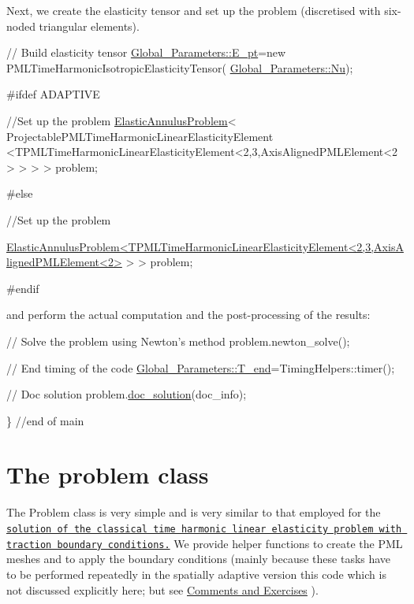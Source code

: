 Next, we create the elasticity tensor and set up the problem (discretised with six-\/noded triangular elements). 
\begin{DoxyCodeInclude}
 \textcolor{comment}{// Build elasticity tensor}
 \hyperlink{namespaceGlobal__Parameters_a9dc0631434879b47501f64851ad679b8}{Global\_Parameters::E\_pt}=\textcolor{keyword}{new} PMLTimeHarmonicIsotropicElasticityTensor(
    \hyperlink{namespaceGlobal__Parameters_a20fccdcfa2c15ad8b951b9ada3bb1661}{Global\_Parameters::Nu});


\textcolor{preprocessor}{#ifdef ADAPTIVE}

 \textcolor{comment}{//Set up the problem}
 \hyperlink{classElasticAnnulusProblem}{ElasticAnnulusProblem}<
 ProjectablePMLTimeHarmonicLinearElasticityElement
  <TPMLTimeHarmonicLinearElasticityElement<2,3,AxisAlignedPMLElement<2> > > 
 > problem;

\textcolor{preprocessor}{#else}

 \textcolor{comment}{//Set up the problem}
 
      \hyperlink{classElasticAnnulusProblem}{ElasticAnnulusProblem<TPMLTimeHarmonicLinearElasticityElement<2,3,AxisAlignedPMLElement<2>}
       > > 
  problem;

\textcolor{preprocessor}{#endif}

\end{DoxyCodeInclude}


and perform the actual computation and the post-\/processing of the results\+:


\begin{DoxyCodeInclude}
 \textcolor{comment}{// Solve the problem using Newton's method}
 problem.newton\_solve();

\end{DoxyCodeInclude}



\begin{DoxyCodeInclude}
 \textcolor{comment}{// End timing of the code}
 \hyperlink{namespaceGlobal__Parameters_a42ef00f24f3bc5c16dae72557c736634}{Global\_Parameters::T\_end}=TimingHelpers::timer();

 \textcolor{comment}{// Doc solution}
 problem.\hyperlink{classElasticAnnulusProblem_ab2952a8591047f62f9f66cfe29a533de}{doc\_solution}(doc\_info);
 
\} \textcolor{comment}{//end of main}

\end{DoxyCodeInclude}
\hypertarget{index_problem}{}\section{The problem class}\label{index_problem}
The {\ttfamily Problem} class is very simple and is very similar to that employed for the \href{../../time_harmonic_linear_elasticity/elastic_annulus/html/index.html}{\tt solution of the classical time harmonic linear elasticity problem with traction boundary conditions.} We provide helper functions to create the P\+ML meshes and to apply the boundary conditions (mainly because these tasks have to be performed repeatedly in the spatially adaptive version this code which is not discussed explicitly here; but see \hyperlink{index_comm_ex}{Comments and Exercises} ).

